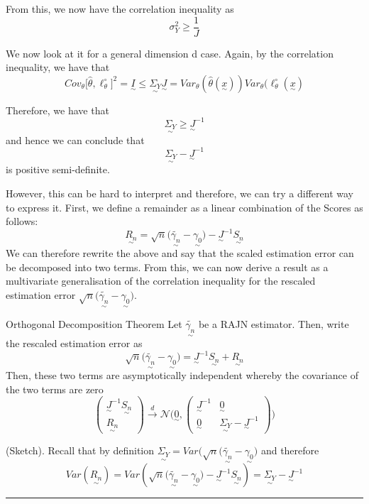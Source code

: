 \documentclass[twoside]{article}
\newenvironment{proof}{{\bf Proof:}}{\hfill\rule{2mm}{2mm}}
\newcommand{\utilde}{\underset{\sim}}
\begin{document}
From this, we now have the correlation inequality as
$$
\sigma_{Y}^{2} \geq \frac{1}{J}
$$

We now look at it for a general dimension d case. Again, by the correlation inequality, we have that 
$$
Cov_{\theta}\bigg[ \hat{\theta},\ell_{\theta}^{\circ}\bigg]^2 = \utilde{I} \leq \utilde{\Sigma_{Y}}\utilde{J} = Var_{\theta}(\hat{\theta}(\utilde{x}))Var_{\theta}(\ell_{\theta}^{\circ}(\utilde{x})
$$

Therefore, we have that 
$$
\utilde{\Sigma_{Y}} \geq \utilde{J}^{-1}
$$
and hence we can conclude that 
$$
\utilde{\Sigma_{Y}} - \utilde{J}^{-1}
$$
is positive semi-definite. 

However, this can be hard to interpret and therefore, we can try a different way to express it. First, we define a remainder as a linear combination of the Scores as follows:
$$
\utilde{R_{n}} = \sqrt{n}\big(\tilde{\utilde{\gamma_{n}}} - \utilde{\gamma_{0}} \big) - \utilde{J}^{-1}\utilde{S_{n}}
$$
We can therefore rewrite the above and say that the scaled estimation error can be decomposed into two terms. From this, we can now derive a result as a multivariate generalisation of the correlation inequality for the rescaled estimation error $\sqrt{n}\big(\tilde{\utilde{\gamma_{n}}} - \utilde{\gamma_{0}} \big).$


\begin{theorem_exam}{Orthogonal Decomposition Theorem}{} Let $\tilde{\utilde{\gamma_{n}}}$ be a RAJN estimator. Then, write the rescaled estimation error as 
\begin{equation}
\sqrt{n}\big(\tilde{\utilde{\gamma_{n}}} - \utilde{\gamma_{0}} \big) = \utilde{J}^{-1}\utilde{S_{n}} + \utilde{R_{n}}
\end{equation}
Then, these two terms are asymptotically independent whereby the covariance of the two terms are zero
\begin{equation}
\begin{pmatrix}
\utilde{J}^{-1}\utilde{S_{n}} \\ \utilde{R_{n}}
\end{pmatrix}
\xrightarrow{d}
\mathcal{N}\bigg(\utilde{0},
\begin{pmatrix}
\utilde{J}^{-1} & \utilde{0}\\
\utilde{0} & \utilde{\Sigma_{Y}} - \utilde{J}^{-1}
\end{pmatrix}
 \bigg)
\end{equation}
\end{theorem_exam}

\begin{proof}(Sketch). Recall that by definition $\utilde{\Sigma_{Y}} = Var(\sqrt{n}\big(\tilde{\utilde{\gamma_{n}}} - \utilde{\gamma_{0}} \big)$ and therefore 
$$
Var(\utilde{R_{n}}) = Var(  \sqrt{n}\big(\tilde{\utilde{\gamma_{n}}} - \utilde{\gamma_{0}}\big) - \utilde{J}^{-1}\utilde{S_{n}}) = \utilde{\Sigma_{Y}} - \utilde{J}^{-1}
$$
\end{proof}
\end{document}
